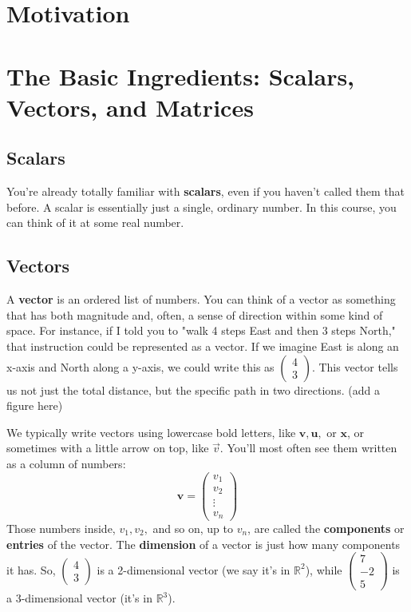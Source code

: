 \documentclass[11pt]{article}
\begin{document}



\section{Motivation}

\section{The Basic Ingredients: Scalars, Vectors, and Matrices}

\subsection{Scalars}

You're already totally familiar with \textbf{scalars}, even if you haven't called them that before. A scalar is essentially just a single, ordinary number. In this course, you can think of it at some real number.

\subsection{Vectors}

A \textbf{vector} is an ordered list of numbers. You can think of a vector as something that has both magnitude and, often, a sense of direction within some kind of space. For instance, if I told you to "walk 4 steps East and then 3 steps North," that instruction could be represented as a vector. If we imagine East is along an x-axis and North along a y-axis, we could write this as $\begin{pmatrix} 4 \\ 3 \end{pmatrix}$. This vector tells us not just the total distance, but the specific path in two directions. (add a figure here)

We typically write vectors using lowercase bold letters, like $\mathbf{v}, \mathbf{u},$ or $\mathbf{x}$, or sometimes with a little arrow on top, like $\vec{v}$. You'll most often see them written as a column of numbers:
\[ \mathbf{v} = \begin{pmatrix} v_1 \\ v_2 \\ \vdots \\ v_n \end{pmatrix} \]
Those numbers inside, $v_1, v_2,$ and so on, up to $v_n$, are called the \textbf{components} or \textbf{entries} of the vector. The \textbf{dimension} of a vector is just how many components it has. So, $\begin{pmatrix} 4 \\ 3 \end{pmatrix}$ is a 2-dimensional vector (we say it's in $\mathbb{R}^2$), while $\begin{pmatrix} 7 \\ -2 \\ 5 \end{pmatrix}$ is a 3-dimensional vector (it's in $\mathbb{R}^3$).
\end{document}

